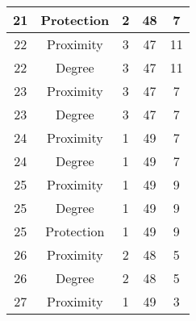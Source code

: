 \documentclass[results.tex]{subfiles}
\begin{document}
\begin{center}
\begin{tabular}{| c || c | c | c | c |}
            \hline
            21                      & Protection                   & 2                      & 48                      & 7                    \\
            \hline
            22                      & Proximity                    & 3                      & 47                      & 11                   \\
            \hline
            22                      & Degree                       & 3                      & 47                      & 11                   \\
            \hline
            23                      & Proximity                    & 3                      & 47                      & 7                    \\
            \hline
            23                      & Degree                       & 3                      & 47                      & 7                    \\
            \hline
            24                      & Proximity                    & 1                      & 49                      & 7                    \\
            \hline
            24                      & Degree                       & 1                      & 49                      & 7                    \\
            \hline
            25                      & Proximity                    & 1                      & 49                      & 9                    \\
            \hline
            25                      & Degree                       & 1                      & 49                      & 9                    \\
            \hline
            25                      & Protection                   & 1                      & 49                      & 9                    \\
            \hline
            26                      & Proximity                    & 2                      & 48                      & 5                    \\
            \hline
            26                      & Degree                       & 2                      & 48                      & 5                    \\
            \hline
            27                      & Proximity                    & 1                      & 49                      & 3                    \\

\end{tabular}
\end{center}
\end{document}
